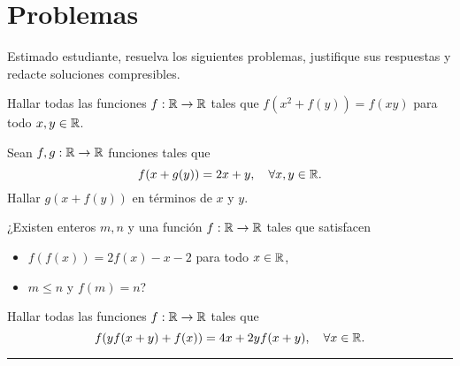 \section*{Problemas}

Estimado estudiante, resuelva los siguientes problemas, justifique sus respuestas y redacte soluciones compresibles.

\begin{problem*}
    Hallar todas las funciones $f: \mathbb{R} \to \mathbb{R}$ tales que $f(x^2 + f(y)) = f(xy)$ para todo $x,y \in \mathbb{R}$.
\end{problem*}

\begin{problem*}
    Sean $f, g :\mathbb{R} \to \mathbb{R}$ funciones tales que
    \[
        f(x + g(y)) = 2x + y, \quad \forall x,y \in \mathbb{R}.
    \]
    Hallar $g(x+ f(y))$ en términos de $x$ y $y$.
\end{problem*}

\begin{problem*}
    ¿Existen enteros $m,n$ y una función $f:\mathbb{R} \to \mathbb{R}$ tales que satisfacen
    \begin{itemize}
        \item $f(f(x)) = 2f(x) - x - 2$ para todo $x \in \mathbb{R}$,
        \item $m \leq n$ y $f(m) = n$?
    \end{itemize}
\end{problem*}

\begin{problem*}
    Hallar todas las funciones $f: \mathbb{R} \to \mathbb{R}$ tales que
    \[
        f(yf(x + y) + f(x)) = 4x + 2yf(x+y), \quad \forall x \in \mathbb{R}.
    \]
\end{problem*}

\hrule